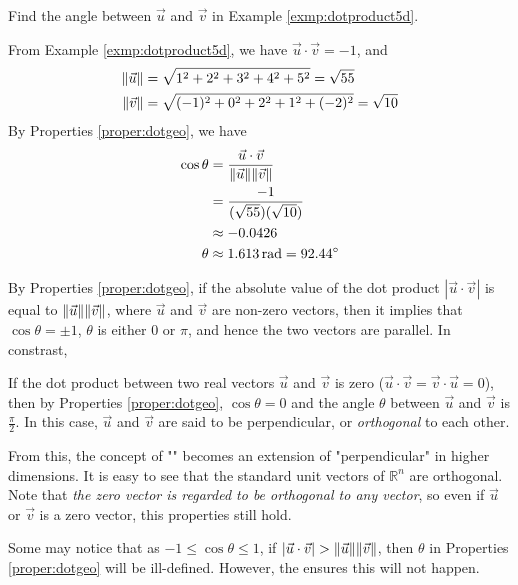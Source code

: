 \begin{exmp}
Find the angle between $\vec{u}$ and $\vec{v}$ in Example \ref{exmp:dotproduct5d}.
\end{exmp}
\begin{solution}
From Example \ref{exmp:dotproduct5d}, we have $\vec{u} \cdot \vec{v} = -1$, and
\begin{align*}
\norm{\vec{u}} &= \sqrt{1^2 + 2^2 + 3^2 + 4^2 + 5^2} = \sqrt{55} \\
\norm{\vec{v}} &= \sqrt{(-1)^2 + 0^2 + 2^2 + 1^2 + (-2)^2} = \sqrt{10} 
\end{align*}
By Properties \ref{proper:dotgeo}, we have
\begin{align*}
\cos\theta &= \frac{\vec{u} \cdot \vec{v}}{\norm{\vec{u}}\norm{\vec{v}}} \\
&= \frac{-1}{(\sqrt{55})(\sqrt{10})} \\
&\approx -0.0426 \\
\theta &\approx \SI{1.613}{\radian} = \SI{92.44}{\degree}
\end{align*}
\end{solution}
By Properties \ref{proper:dotgeo}, if the absolute value of the dot product $|\vec{u} \cdot \vec{v}|$ is equal to $\norm{\vec{u}}\norm{\vec{v}}$, where $\vec{u}$ and $\vec{v}$ are non-zero vectors, then it implies that $\cos\theta = \pm 1$, $\theta$ is either $0$ or $\pi$, and hence the two vectors are parallel. In constrast,
\begin{proper}
\label{proper:dotorth}
If the dot product between two real vectors $\vec{u}$ and $\vec{v}$ is zero ($\vec{u} \cdot \vec{v} = \vec{v} \cdot \vec{u} = 0$), then by Properties \ref{proper:dotgeo}, $\cos\theta = 0$ and the angle $\theta$ between $\vec{u}$ and $\vec{v}$ is $\frac{\pi}{2}$. In this case, $\vec{u}$ and $\vec{v}$ are said to be perpendicular, or \textit{orthogonal} to each other.
\end{proper}
From this, the concept of "" becomes an extension of "perpendicular" in higher dimensions. It is easy to see that the standard unit vectors of $\mathbb{R}^n$ are orthogonal. Note that \textit{the zero vector is regarded to be orthogonal to any vector}, so even if $\vec{u}$ or $\vec{v}$ is a zero vector, this properties still hold. \par
Some may notice that as $-1 \leq \cos\theta \leq 1$, if $|\vec{u} \cdot \vec{v}| > \norm{\vec{u}}\norm{\vec{v}}$, then $\theta$ in Properties \ref{proper:dotgeo} will be ill-defined. However, the  ensures this will not happen.

